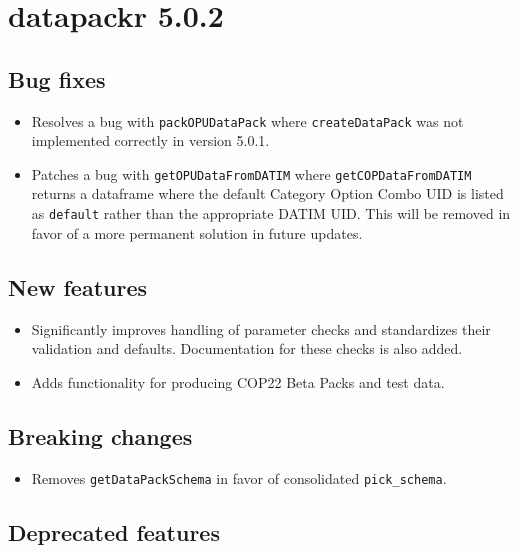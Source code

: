 \documentclass[
  openany]{book}
\providecommand{\tightlist}{%
  \setlength{\itemsep}{0pt}\setlength{\parskip}{0pt}}
\begin{document}
\hypertarget{datapackr-5.0.2}{%
\section{datapackr 5.0.2}\label{datapackr-5.0.2}}

\hypertarget{bug-fixes}{%
\subsection{Bug fixes}\label{bug-fixes}}

\begin{itemize}
\tightlist
\item
  Resolves a bug with \texttt{packOPUDataPack} where \texttt{createDataPack} was not
  implemented correctly in version 5.0.1.
\item
  Patches a bug with \texttt{getOPUDataFromDATIM} where \texttt{getCOPDataFromDATIM} returns
  a dataframe where the default Category Option Combo UID is listed as \texttt{default}
  rather than the appropriate DATIM UID. This will be removed in favor of a more
  permanent solution in future updates.
\end{itemize}

\hypertarget{new-features-1}{%
\subsection{New features}\label{new-features-1}}

\begin{itemize}
\tightlist
\item
  Significantly improves handling of parameter checks and standardizes their
  validation and defaults. Documentation for these checks is also added.
\item
  Adds functionality for producing COP22 Beta Packs and test data.
\end{itemize}

\hypertarget{breaking-changes-1}{%
\subsection{Breaking changes}\label{breaking-changes-1}}

\begin{itemize}
\tightlist
\item
  Removes \texttt{getDataPackSchema} in favor of consolidated \texttt{pick\_schema}.
\end{itemize}

\hypertarget{deprecated-features-1}{%
\subsection{Deprecated features}\label{deprecated-features-1}}
\end{document}

